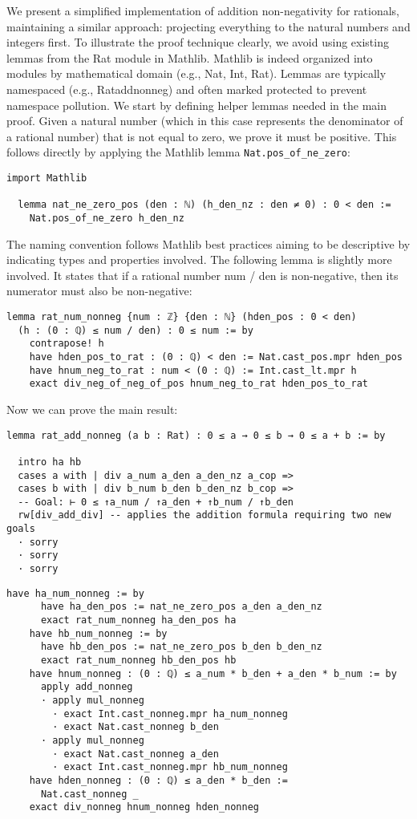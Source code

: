 \begin{example}
We present a simplified implementation of addition non-negativity for rationals, 
maintaining a similar approach: projecting everything to the natural numbers and 
integers first. To illustrate the proof technique clearly, we avoid using existing lemmas 
from the Rat module in Mathlib.
Mathlib is indeed organized into modules by mathematical 
domain (e.g., Nat, Int, Rat). Lemmas are typically namespaced (e.g., Rataddnonneg) 
and often marked protected to prevent namespace pollution. 
We start by defining helper lemmas needed in the main proof.
Given a natural number 
(which in this case represents the denominator of a rational number) that is not 
equal to zero, we prove it must be positive. This follows directly by 
applying the Mathlib lemma \lstinline[language=lean]|Nat.pos_of_ne_zero|:
\begin{lstlisting}[language=lean]
  import Mathlib

  lemma nat_ne_zero_pos (den : ℕ) (h_den_nz : den ≠ 0) : 0 < den :=
    Nat.pos_of_ne_zero h_den_nz
\end{lstlisting}
The naming convention follows Mathlib 
best practices aiming to be descriptive by indicating 
types and properties involved.
The following lemma is slightly more involved. 
It states that if a rational number num / den 
is non-negative, then its numerator must also be non-negative:
\begin{lstlisting}[language=lean]
  lemma rat_num_nonneg {num : ℤ} {den : ℕ} (hden_pos : 0 < den)
  (h : (0 : ℚ) ≤ num / den) : 0 ≤ num := by
    contrapose! h
    have hden_pos_to_rat : (0 : ℚ) < den := Nat.cast_pos.mpr hden_pos
    have hnum_neg_to_rat : num < (0 : ℚ) := Int.cast_lt.mpr h
    exact div_neg_of_neg_of_pos hnum_neg_to_rat hden_pos_to_rat
\end{lstlisting}
Now we can prove the main result:
\begin{lstlisting}[language=lean]
lemma rat_add_nonneg (a b : Rat) : 0 ≤ a → 0 ≤ b → 0 ≤ a + b := by

  intro ha hb
  cases a with | div a_num a_den a_den_nz a_cop =>
  cases b with | div b_num b_den b_den_nz b_cop =>
  -- Goal: ⊢ 0 ≤ ↑a_num / ↑a_den + ↑b_num / ↑b_den
  rw[div_add_div] -- applies the addition formula requiring two new goals 
  · sorry 
  · sorry 
  · sorry
\end{lstlisting}

\newpage
\begin{lstlisting}[language=lean]
  have ha_num_nonneg := by
      have ha_den_pos := nat_ne_zero_pos a_den a_den_nz
      exact rat_num_nonneg ha_den_pos ha
    have hb_num_nonneg := by
      have hb_den_pos := nat_ne_zero_pos b_den b_den_nz
      exact rat_num_nonneg hb_den_pos hb
    have hnum_nonneg : (0 : ℚ) ≤ a_num * b_den + a_den * b_num := by
      apply add_nonneg
      · apply mul_nonneg
        · exact Int.cast_nonneg.mpr ha_num_nonneg
        · exact Nat.cast_nonneg b_den
      · apply mul_nonneg
        · exact Nat.cast_nonneg a_den
        · exact Int.cast_nonneg.mpr hb_num_nonneg
    have hden_nonneg : (0 : ℚ) ≤ a_den * b_den := 
      Nat.cast_nonneg _
    exact div_nonneg hnum_nonneg hden_nonneg
\end{lstlisting}

\end{example}
